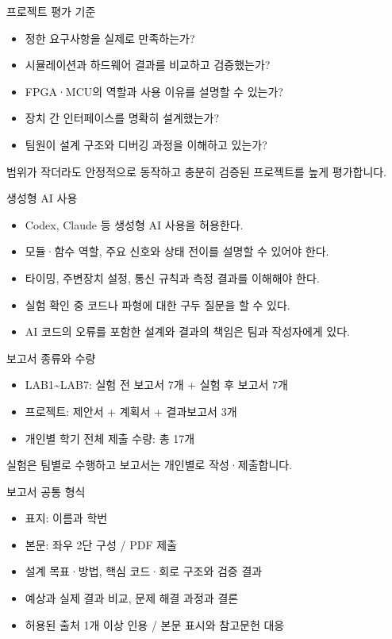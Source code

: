 \documentclass[aspectratio=169,11pt,t]{beamer}
\begin{document}
\begin{frame}{프로젝트 평가 기준}
\begin{itemize}
\item 정한 요구사항을 실제로 만족하는가?
\item 시뮬레이션과 하드웨어 결과를 비교하고 검증했는가?
\item FPGA·MCU의 역할과 사용 이유를 설명할 수 있는가?
\item 장치 간 인터페이스를 명확히 설계했는가?
\item 팀원이 설계 구조와 디버깅 과정을 이해하고 있는가?
\end{itemize}
\vspace{0.35cm}
범위가 작더라도 안정적으로 동작하고 충분히 검증된 프로젝트를 높게 평가합니다.
\end{frame}

\begin{frame}{생성형 AI 사용}
\begin{itemize}
\item Codex, Claude 등 생성형 AI 사용을 허용한다.
\item 모듈·함수 역할, 주요 신호와 상태 전이를 설명할 수 있어야 한다.
\item 타이밍, 주변장치 설정, 통신 규칙과 측정 결과를 이해해야 한다.
\item 실험 확인 중 코드나 파형에 대한 구두 질문을 할 수 있다.
\item AI 코드의 오류를 포함한 설계와 결과의 책임은 팀과 작성자에게 있다.
\end{itemize}
\end{frame}

\begin{frame}{보고서 종류와 수량}
\begin{itemize}
\item LAB1\textasciitilde{}LAB7: 실험 전 보고서 7개 + 실험 후 보고서 7개
\item 프로젝트: 제안서 + 계획서 + 결과보고서 3개
\item 개인별 학기 전체 제출 수량: 총 17개
\end{itemize}
\vspace{0.35cm}
실험은 팀별로 수행하고 보고서는 개인별로 작성·제출합니다.
\end{frame}

\begin{frame}{보고서 공통 형식}
\begin{itemize}
\item 표지: 이름과 학번
\item 본문: 좌우 2단 구성 / PDF 제출
\item 설계 목표·방법, 핵심 코드·회로 구조와 검증 결과
\item 예상과 실제 결과 비교, 문제 해결 과정과 결론
\item 허용된 출처 1개 이상 인용 / 본문 표시와 참고문헌 대응
\end{itemize}
\end{frame}
\end{document}
